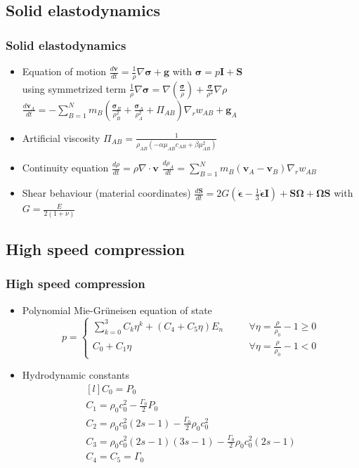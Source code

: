 \documentclass{beamer}
\begin{document}
\subsection{Solid elastodynamics}
\begin{frame}
\frametitle{Solid elastodynamics}
\begin{itemize}
\item Equation of motion $\frac{d\bm v}{dt}=\frac{1}{\rho}\nabla\bm\sigma+\bm g$ with $\bm\sigma=p\bm{I}+\bm{S}$ \\ using symmetrized term $\frac{1}{\rho}\nabla\bm\sigma=\nabla\left(\frac{\bm\sigma}{\rho}\right)+\frac{\bm\sigma}{\rho^2}\nabla\rho$
$\frac{d{\bm v}_A}{dt}=-\sum\limits_{B=1}^{N}m_B\left(\frac{\bm\sigma_B}{\rho_B^2}+\frac{\bm\sigma_A}{\rho_A^2}+\Pi_{AB}\right)\nabla_r w_{AB}+{\bm g}_A$
\item Artificial viscosity $\Pi_{AB}=\frac{1}{\rho_{AB}\left(-\alpha\mu_{AB}c_{AB}+\beta\mu_{AB}^2\right)}$
\item Continuity equation $\frac{d\rho}{dt}=\rho\nabla\cdot{\bm v}$
$\frac{d\rho_A}{dt}=\sum\limits_{B=1}^{N}m_B\left({\bm v}_A-{\bm v}_B\right)\nabla_r w_{AB}$
\item Shear behaviour (material coordinates)
$\frac{d\bm{S}}{dt}=2G\left(\bm{\dot\epsilon}-\frac{1}{3}\bm{\dot\epsilon}\bm{I}\right)+\bm{S\Omega}+\bm{\Omega S}$ with $G=\frac{E}{2(1+\nu)}$
\end{itemize}
\end{frame}

\subsection{High speed compression}
\begin{frame}
\frametitle{High speed compression}
\begin{itemize}
\item Polynomial Mie-Gr\"uneisen equation of state
$$
p=\left\{\begin{matrix}
\sum\limits_{k=0}^3 C_k\eta^k+\left(C_4+C_5\eta\right)E_n & \quad & \forall\eta=\frac{\rho}{\rho_0}-1\ge 0\\
C_0+C_1\eta & \quad & \forall\eta=\frac{\rho}{\rho_0}-1<0
\end{matrix}\right.
$$
\item Hydrodynamic constants
$$
\begin{matrix*}[l]
C_0=P_0 \\
C_1=\rho_0 c_0^2-\frac{\Gamma_0}{2}P_0 \\
C_2=\rho_0 c_0^2(2s-1)-\frac{\Gamma_0}{2}\rho_0 c_0^2 \\
C_3=\rho_0 c_0^2(2s-1)(3s-1)-\frac{\Gamma_0}{2}\rho_0 c_0^2(2s-1) \\
C_4=C_5=\Gamma_0
\end{matrix*}
$$
\end{itemize}
\end{frame}
\end{document}
